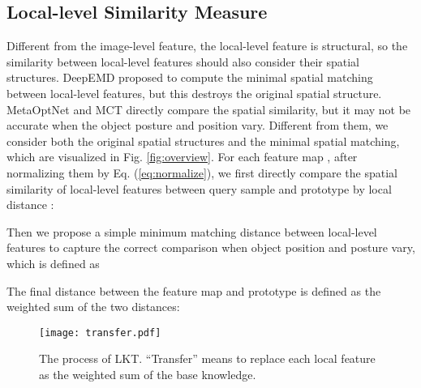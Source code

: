 \documentclass{article}
\begin{document}
\subsection{Local-level Similarity Measure}
\label{sec:distance}
Different from the image-level feature, the local-level feature is structural, so the similarity between local-level features should also consider their spatial structures. DeepEMD \cite{zhang2020deepemd} proposed to compute the minimal spatial matching between local-level features, but this destroys the original spatial structure. MetaOptNet \cite{lee2019meta} and MCT \cite{kye2020transductive} directly compare the spatial similarity, but it may not be accurate when the object posture and position vary. Different from them, we consider both the original spatial structures and the minimal spatial matching, which are visualized in Fig. \ref{fig:overview}. For each feature map , after normalizing them by Eq. (\ref{eq:normalize}), we first directly compare the spatial similarity of local-level features between query sample and prototype  by local distance :


Then we propose a simple minimum matching distance  between local-level features to capture the correct comparison when object position and posture vary, which is defined as

The final distance between the feature map and prototype is defined as the weighted sum of the two distances: 



\begin{figure}[h]
	\begin{center}
        \vspace{-10pt}
	    \texttt{[image: transfer.pdf]}
	\end{center}
	\vspace{-15pt}
	\caption{ The process of LKT. ``Transfer'' means to replace each local feature as the weighted sum of the base knowledge. }
	\label{fig:adaption}
	\vspace{-10pt}
\end{figure}
\end{document}
